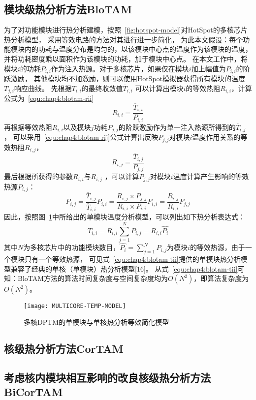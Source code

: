 \subsection{模块级热分析方法BloTAM}
为了对功能模块进行热分析建模，按照~\ref{fig:hotspot-model}对HotSpot的多核芯片热分析模型， 采用等效电路的方法对其进行进一步简化， 为此本文假设：每个功能模块内的功耗与温度分布是均匀的，以该模块中心点的温度作为该模块的温度， 并将功耗密度乘以面积作为该模块的功耗，加于模块中心点。
在本文工作中，将模块$i$的功耗$P_{i,i}$作为注入热源。对于多核芯片，如果仅在模块$i$加上幅值为$P_{i,i}$的阶跃激励， 其他模块均不加激励，则可以使用HotSpot模拟器获得所有模块的温度$T_{j,i}$响应曲线。 先根据$T_{i,i}$的最终收敛值$\overline{T}_{i,i}$ 可以计算出模块$i$的等效热阻$R_{i,i}$，计算公式为~\ref{equ:chap4:blotam-rii}
\begin{equation}
\label{equ:chap4:blotam-rii}
R_{i,i} = \frac{\overline{T}_{i,i}}{P_{i,i}}
\end{equation}
再根据等效热阻$R_{i,i}$以及模块$j$功耗$P_{j,j}$的阶跃激励作为单一注入热源所得到的$\overline{T}_{i,j}$， 可以采用~\ref{equ:chap4:blotam-rij}公式计算出反映$P_{j,j}$对模块$i$温度作用关系的等效热阻$R_{i,j}$，
\begin{equation}
\label{equ:chap4:blotam-rij}
R_{i,j} = \frac{\overline{T}_{i,j}}{P_{j,j}}
\end{equation}
最后根据所获得的参数$R_{i,i}$与$R_{i,j}$ ，可以计算$P_{j,j}$对模块$i$温度计算产生影响的等效热源$P_{i,j}$：
\begin{equation}
\label{equ:chap4:blotam-pij}
P_{i,j} = \frac{\overline{T}_{i,j}}{\overline{T}_{i,i}}P_{i,i} = \frac{R_{i,j}\times P_{j,j}}{R_{i,i}\times P_{i,i}}P_{i,i}=\frac{R_{i,j}}{R_{i,i}}P_{j,j}
\end{equation}
因此，按照图~\ref{fig:multicore-temp-model}中所给出的单模块温度分析模型，可以列出如下热分析表达式：
\begin{equation}
\label{equ:chap4:blotam-tii}
T_{i,i} = R_{i,i}\sum\limits_{j=1}^N P_{i,j} = R_{i,i}\widehat{P_{i}}
\end{equation}
其中$N$为多核芯片中的功能模块数目，$\widehat{P_{i}} = \sum\limits_{j=1}^N P_{i,j}$为模块$i$的等效热源，由于一个模块只有一个等效热源， 可见式~\ref{equ:chap4:blotam-tii}提供的单模块热分析模型兼容了经典的单核（单模块）热分析模型[16]。 从式~\ref{equ:chap4:blotam-tii}可知：BloTAM方法的算法时间复杂度与空间复杂度均为$O(N^2)$，即算法复杂度为$O(N^2)$。
\begin{figure}[H]
  \centering
  \texttt{[image: MULTICORE-TEMP-MODEL]}
  \caption{多核DPTM的单模块与单核热分析等效简化模型}
  \label{fig:multicore-temp-model}
\end{figure}

\subsection{核级热分析方法CorTAM}








\subsection{考虑核内模块相互影响的改良核级热分析方法BiCorTAM}



